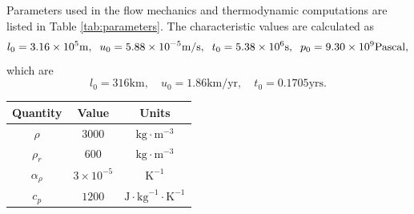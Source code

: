 Parameters used in the flow mechanics and thermodynamic computations are listed in Table \ref{tab:parameters}. 
The characteristic values are calculated as
\begin{equation}\label{eq:characteristic}
l_0 = 3.16\times10^5 \text{m}, \hspace{0.2cm} u_0 = 5.88\times10^{-5} \text{m/s}, \hspace{0.2cm} t_0 = 5.38\times10^6 \text{s}, \hspace{0.2cm} p_0 = 9.30\times10^9 \text{Pascal},
\end{equation}
which are 
\begin{equation}\label{eq:characteristic_geounit}
		  l_0 = 316\text{km}, \quad u_0 = 1.86 \text{km/yr}, \quad t_0 = 0.1705 \text{yrs}.
\end{equation}
\begin{table}[htb]
\centering
\begin{tabular}{c | c c}
Quantity & Value & Units \\
\hline
		  $\rho$       & $3000$           & $\text{kg}\cdot \text{m}^{-3}$              \\
		  $\rho_r$       & $600$           & $\text{kg}\cdot \text{m}^{-3}$              \\
		  $\alpha_\rho$  & $3\times10^{-5}$ & $\text{K}^{-1}$                      \\
		  $c_p$          & $1200$           & $\text{J}\cdot \text{kg}^{-1} \cdot \text{K}^{-1}$ \\

\end{tabular}
\end{table}
